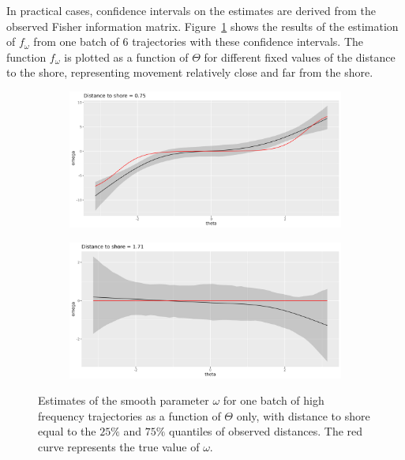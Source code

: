 \documentclass[11pt]{article}
\newcommand {\1}{\mathbb{1}}
\theoremstyle{definition}
\theoremstyle{remark}
\theoremstyle{remark}
\begin{document}
In practical cases, confidence intervals on the estimates are derived from the observed Fisher information matrix. Figure~\ref{fig: marginal_estimates_CRCVM} shows the results of the estimation of $f_{\omega}$ from one batch of $6$ trajectories with these confidence intervals.  The function $f_{\omega}$  is plotted as a function of $\Theta$ for different fixed values of the distance to the shore, representing movement relatively close and far from the shore.


\begin{figure}[H]
	\centering
	\begin{subfigure}{0.48\textwidth}
		\centering
		\includegraphics[scale=0.25]{images/simulation study/fe_crcvm_fjords_hf_ne1_omega_theta_q4_ExpShore .png}
		\caption{}
	\end{subfigure}
	\begin{subfigure}{0.48\textwidth}
		\centering
		\includegraphics[scale=0.25]{images/simulation study/fe_crcvm_fjords_hf_ne1_omega_theta_q2_ExpShore .png}
		\caption{}
	\end{subfigure}
	\caption{Estimates of the smooth parameter $\omega$ for one batch of high frequency trajectories as a function of $\Theta$ only, with distance to shore equal to the $25\%$ and $75\%$ quantiles of observed distances. The red curve represents the true value of $\omega$.}
	\label{fig: marginal_estimates_CRCVM}
\end{figure}
\end{document}
